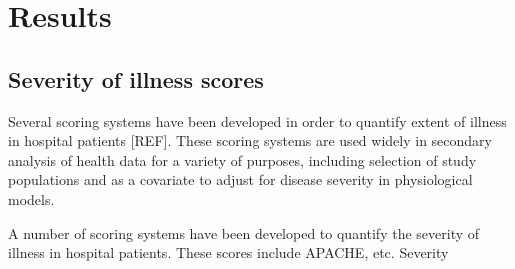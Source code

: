 \documentclass{elsart}
\begin{document}







\section{Results}

\subsection{Severity of illness scores}

Several scoring systems have been developed in order to quantify extent of illness in hospital patients [REF]. These scoring systems are used widely in secondary analysis of health data for a variety of purposes, including selection of study populations and as a covariate to adjust for disease severity in physiological models.




A number of scoring systems have been developed to quantify the severity of illness in hospital patients. These scores include APACHE, etc. Severity 
\end{document}
